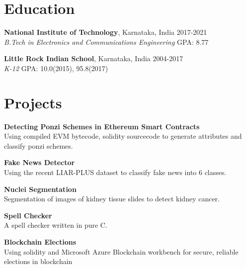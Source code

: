 \documentclass[margin]{res}
\begin{document}
  \address{National Institute of Technology\\Karnataka, India\\nitk.ac.in}
  \address{(91+) 9611212081\\russel.171ec143@nitk.edu.in\\github.com/rshwndsz}

  \begin{resume}
    \section{Education}
      \textbf{National Institute of Technology}, Karnataka, India\hfill 
      2017-2021
      \\
      {\sl B.Tech in Electronics and Communications Engineering}\hfill 
      GPA: 8.77
      

      \textbf{Little Rock Indian School}, Karnataka, India\hfill
      2004-2017
      \\
      {\sl K-12}\hfill
      GPA: 10.0(2015), 95.8(2017)

    \section{Projects}
      \par
      \textbf{Detecting Ponzi Schemes in Ethereum Smart Contracts}\\
      Using compiled EVM bytecode, solidity sourcecode to generate attributes 
      and classify ponzi schemes.

      \par
      \textbf{Fake News Detector}\\
      Using the recent LIAR-PLUS dataset to classify fake news into 6 classes.

      \par
      \textbf{Nuclei Segmentation}\\
      Segmentation of images of kidney tissue slides to detect kidney cancer.

      \par
      \textbf{Spell Checker}\\
      A spell checker written in pure C.

      \par
      \textbf{Blockchain Elections}\\
      Using solidity and Microsoft Azure Blockchain workbench for secure, reliable elections in blockchain


\end{resume}
\end{document}
